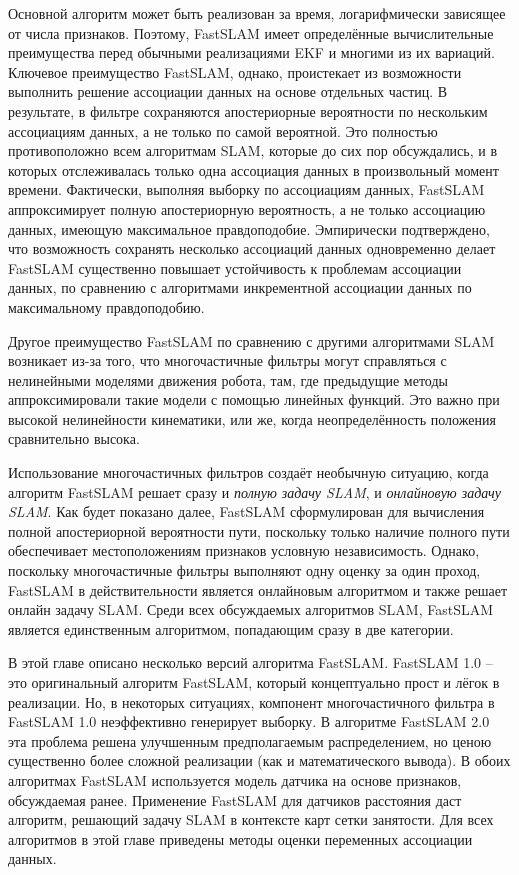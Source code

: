\documentclass[10pt,a4paper]{article}
\begin{document}
Основной алгоритм может быть реализован за время, логарифмически зависящее от числа признаков. Поэтому, FastSLAM имеет определённые вычислительные преимущества перед обычными реализациями EKF и многими из их вариаций. Ключевое преимущество FastSLAM, однако, проистекает из возможности выполнить решение ассоциации данных на основе отдельных частиц. В результате, в фильтре сохраняются апостериорные вероятности по нескольким ассоциациям данных, а не только по самой вероятной. Это полностью противоположно всем алгоритмам SLAM, которые до сих пор обсуждались, и в которых отслеживалась только одна ассоциация данных в произвольный момент времени. Фактически, выполняя выборку по ассоциациям данных, FastSLAM аппроксимирует полную апостериорную вероятность, а не только ассоциацию данных, имеющую максимальное правдоподобие. Эмпирически подтверждено, что возможность сохранять несколько ассоциаций данных одновременно делает FastSLAM существенно повышает устойчивость к проблемам ассоциации данных, по сравнению с алгоритмами инкрементной ассоциации данных по максимальному правдоподобию.

Другое преимущество FastSLAM по сравнению с другими алгоритмами SLAM возникает из-за того, что многочастичные фильтры могут справляться с нелинейными моделями движения робота, там, где предыдущие методы аппроксимировали такие модели с помощью линейных функций. Это важно при высокой нелинейности кинематики, или же, когда неопределённость положения сравнительно высока.

Использование многочастичных фильтров создаёт необычную ситуацию, когда алгоритм FastSLAM решает сразу и \textit{полную задачу SLAM}, и \textit{онлайновую задачу SLAM}. Как будет показано далее, FastSLAM сформулирован для вычисления полной апостериорной вероятности пути, поскольку только наличие полного пути обеспечивает местоположениям признаков условную независимость. Однако, поскольку многочастичные фильтры выполняют одну оценку за один проход, FastSLAM в действительности является онлайновым алгоритмом и также решает онлайн задачу SLAM. Среди всех обсуждаемых алгоритмов SLAM, FastSLAM является единственным алгоритмом, попадающим сразу в две категории.

В этой главе описано несколько версий алгоритма FastSLAM. FastSLAM 1.0 – это оригинальный алгоритм FastSLAM, который концептуально прост и лёгок в реализации. Но, в некоторых ситуациях, компонент многочастичного фильтра в FastSLAM 1.0 неэффективно генерирует выборку. В алгоритме FastSLAM 2.0 эта проблема решена улучшенным предполагаемым распределением, но ценою существенно более сложной реализации (как и математического вывода). В обоих алгоритмах FastSLAM используется модель датчика на основе признаков, обсуждаемая ранее. Применение FastSLAM для датчиков расстояния даст алгоритм, решающий задачу SLAM в контексте карт сетки занятости.  Для всех алгоритмов в этой главе приведены методы оценки переменных ассоциации данных.\\
\end{document}
